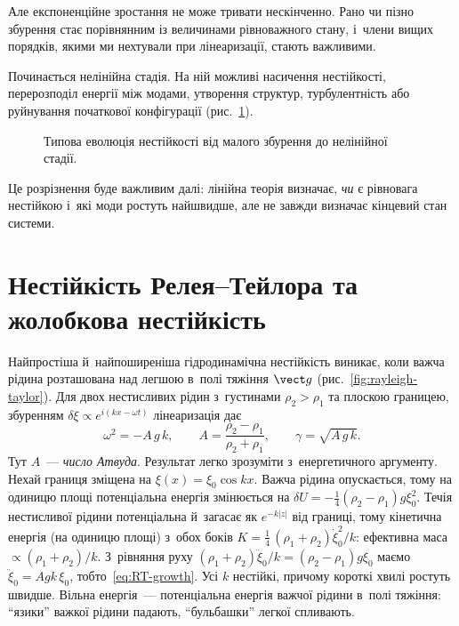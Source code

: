 Але експоненційне зростання не може тривати нескінченно. Рано чи
пізно збурення стає порівнянним із величинами рівноважного стану,
і~члени вищих порядків, якими ми нехтували при лінеаризації,
стають важливими.

Починається нелінійна стадія. На ній можливі насичення нестійкості,
перерозподіл енергії між модами, утворення структур, турбулентність
або руйнування початкової конфігурації (рис.~\ref{fig:instability-linear-nonlinear}).

\begin{figure}[ht]
\centering
{}
\caption{Типова еволюція нестійкості від малого збурення до
нелінійної стадії.}
\label{fig:instability-linear-nonlinear}
\end{figure}

Це розрізнення буде важливим далі: лінійна теорія визначає, \emph{чи}
є рівновага нестійкою і~які моди ростуть найшвидше, але не завжди
визначає кінцевий стан системи.

\section{Нестійкість Релея--Тейлора та жолобкова нестійкість}\label{sec:rayleigh-taylor}

Найпростіша й~найпоширеніша гідродинамічна нестійкість виникає, коли важча рідина
розташована над легшою в~полі тяжіння $\vect g$ (рис.~\ref{fig:rayleigh-taylor}). Для двох
нестисливих рідин з~густинами $\rho_2>\rho_1$ та плоскою границею, збуренням
$\delta\xi\propto e^{i(kx-\omega t)}$ лінеаризація дає
\begin{equation}\label{eq:RT-growth}
	\omega^2=-A\,g\,k,\qquad A=\frac{\rho_2-\rho_1}{\rho_2+\rho_1},\qquad
	\gamma=\sqrt{A\,g\,k}.
\end{equation}
Тут $A$~--- \emph{число Атвуда}. Результат легко зрозуміти з~енергетичного аргументу. Нехай границя зміщена на
$\xi(x)=\xi_0\cos kx$. Важча рідина опускається, тому на одиницю площі потенціальна енергія змінюється на
$\delta U=-\tfrac14(\rho_2-\rho_1)g\xi_0^2$. Течія нестисливої рідини потенціальна й~загасає як $e^{-k|z|}$ від границі,
тому кінетична енергія (на одиницю площі) з~обох боків
$K=\tfrac14\,(\rho_1+\rho_2)\dot\xi_0^2/k$: ефективна маса $\propto(\rho_1+\rho_2)/k$. З~рівняння руху
$(\rho_1+\rho_2)\ddot\xi_0/k=(\rho_2-\rho_1)g\xi_0$ маємо $\ddot\xi_0=Agk\,\xi_0$, тобто~\eqref{eq:RT-growth}.
Усі $k$ нестійкі, причому короткі хвилі ростуть швидше. Вільна енергія~--- потенціальна
енергія важчої рідини в~полі тяжіння: \enquote{язики} важкої рідини падають, \enquote{бульбашки} легкої
спливають.

